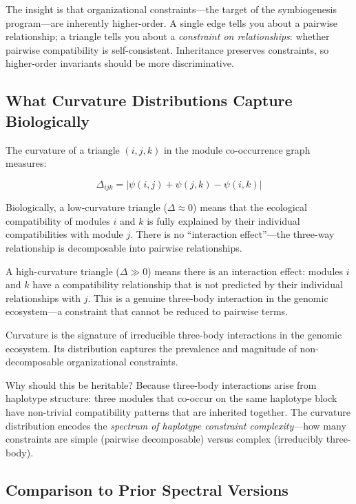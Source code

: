 \documentclass{../yalumba}
\begin{document}
The insight is that organizational constraints---the target of the
symbiogenesis program---are inherently higher-order.  A single edge
tells you about a pairwise relationship; a triangle tells you about a
\emph{constraint on relationships}: whether pairwise compatibility is
self-consistent.  Inheritance preserves constraints, so higher-order
invariants should be more discriminative.

\subsection{What Curvature Distributions Capture Biologically}

The curvature of a triangle $(i,j,k)$ in the module co-occurrence graph
measures:

\begin{equation}
  \Delta_{ijk} = |\psi(i,j) + \psi(j,k) - \psi(i,k)|
  \label{eq:curvature-biology}
\end{equation}

Biologically, a low-curvature triangle ($\Delta \approx 0$) means that
the ecological compatibility of modules $i$ and $k$ is fully explained
by their individual compatibilities with module $j$.  There is no
``interaction effect''---the three-way relationship is decomposable into
pairwise relationships.

A high-curvature triangle ($\Delta \gg 0$) means there is an interaction
effect: modules $i$ and $k$ have a compatibility relationship that is not
predicted by their individual relationships with $j$.  This is a genuine
three-body interaction in the genomic ecosystem---a constraint that
cannot be reduced to pairwise terms.

\begin{pullquote}
Curvature is the signature of irreducible three-body interactions in the
genomic ecosystem.  Its distribution captures the prevalence and magnitude
of non-decomposable organizational constraints.
\end{pullquote}

Why should this be heritable?  Because three-body interactions arise from
haplotype structure: three modules that co-occur on the same haplotype
block have non-trivial compatibility patterns that are inherited together.
The curvature distribution encodes the \emph{spectrum of haplotype
constraint complexity}---how many constraints are simple (pairwise
decomposable) versus complex (irreducibly three-body).

\subsection{Comparison to Prior Spectral Versions}
\end{document}
